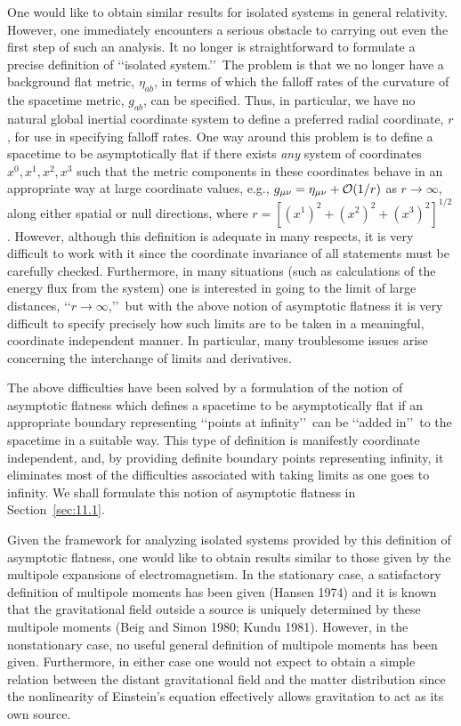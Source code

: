 One would like to obtain similar results for isolated systems in general relativity.
However, one immediately encounters a serious obstacle to carrying out even the
first step of such an analysis. It no longer is straightforward to formulate a precise
definition of \lq\lq isolated system.\rq\rq\ The problem is that we no longer have a background
flat metric, \(\eta_{ab}\), in terms of which the falloff rates of the curvature of the
spacetime metric, \(g_{ab}\), can be specified. Thus, in particular, we have no natural
global inertial coordinate system to define a preferred radial coordinate, \(r\), for
use in specifying falloff rates. One way around this problem is to define a spacetime
to be asymptotically flat if there exists \emph{any} system of coordinates
\(x^0,x^1,x^2,x^3\) such that the metric components in these coordinates behave in an
appropriate way at large coordinate values, e.g.,
\(g_{\mu\nu}=\eta_{\mu\nu}+\mathcal{O}(1/r)\) as \(r\to\infty\), along either spatial or
null directions, where \(r=[(x^1)^2+(x^2)^2+(x^3)^2]^{1/2}\). However, although this
definition is adequate in many respects, it is very difficult to work with it since the
coordinate invariance of all statements must be carefully checked. Furthermore, in
many situations (such as calculations of the energy flux from the system) one is
interested in going to the limit of large distances, \lq\lq \(r\to\infty\),\rq\rq\ but with the
above notion of asymptotic flatness it is very difficult to specify precisely how such
limits are to be taken in a meaningful, coordinate independent manner. In particular,
many troublesome issues arise concerning the interchange of limits and derivatives.

The above difficulties have been solved by a formulation of the notion of asymptotic
flatness which defines a spacetime to be asymptotically flat if an appropriate
boundary representing \lq\lq points at infinity\rq\rq\ can be \lq\lq added in\rq\rq\ to the spacetime in a
suitable way. This type of definition is manifestly coordinate independent, and, by
providing definite boundary points representing infinity, it eliminates most of the
difficulties associated with taking limits as one goes to infinity. We shall formulate
this notion of asymptotic flatness in Section~\ref{sec:11.1}.

Given the framework for analyzing isolated systems provided by this definition of
asymptotic flatness, one would like to obtain results similar to those given by the
multipole expansions of electromagnetism. In the stationary case, a satisfactory
definition of multipole moments has been given (Hansen 1974) and it is known that
the gravitational field outside a source is uniquely determined by these multipole
moments (Beig and Simon 1980; Kundu 1981). However, in the nonstationary case,
no useful general definition of multipole moments has been given. Furthermore, in
either case one would not expect to obtain a simple relation between the distant
gravitational field and the matter distribution since the nonlinearity of Einstein's
equation effectively allows gravitation to act as its own source.

